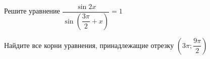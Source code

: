 \begin{ex}
	\begin{condition}
		\begin{enumcols}[label=\asbuk*)]
			\item Решите уравнение \( \dfrac{\sin 2x}{\sin \left(\dfrac{3\pi}{2} + x\right)} = 1 \)
			\item Найдите все корни уравнения, принадлежащие отрезку \( \left(3\pi;\dfrac{9\pi}{2}\right) \)
		\end{enumcols}
	\end{condition}
\end{ex}
